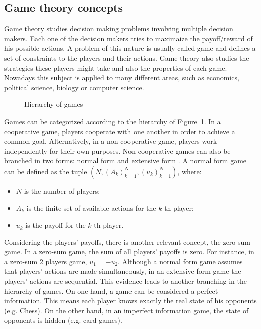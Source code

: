 \subsection{Game theory concepts}

Game theory studies decision making problems involving multiple decision makers.
Each one of the decision makers tries to maximaize the payoff/reward of his possible actions.
A problem of this nature is usually called game and defines a set of constraints to the players and their actions.
Game theory also studies the strategies these players might take and also the properties of each game.
Nowadays this subject is applied to many different areas, such as economics, political science, biology or computer science.\\

\begin{figure}
\centering
\caption{Hierarchy of games}
\label{fig:games}
\end{figure}

Games can be categorized according to the hierarchy of Figure~\ref{fig:games}.
In a cooperative game, players cooperate with one another in order to achieve a common goal.
Alternatively, in a non-cooperative game, players work independently for their own purposes.
Non-cooperative games can also be branched in two forms: normal form and extensive form \cite{Shoham2010}.
A normal form game can be defined as the tuple $(N,(A_k)_{k=1}^{N},(u_k)_{k=1}^{N})$, where:
\begin{itemize}
\item $N$ is the number of players;
\item $A_k$ is the finite set of available actions for the $k$-th player;
\item $u_k$ is the payoff for the $k$-th player.
\end{itemize}
Considering the players' payoffs, there is another relevant concept, the zero-sum game.
In a zero-sum game, the sum of all players' payoffs is zero.
For instance, in a zero-sum 2 players game, $u_1 = -u_2$.
Although a normal form game assumes that players' actions are made simultaneously, in an extensive form game the players' actions are sequential.
This evidence leads to another branching in the hierarchy of games.
On one hand, a game can be considered a perfect information.
This means each player knows exactly the real state of his opponents (e.g. Chess).
On the other hand, in an imperfect information game, the state of opponents is hidden (e.g. card games).

